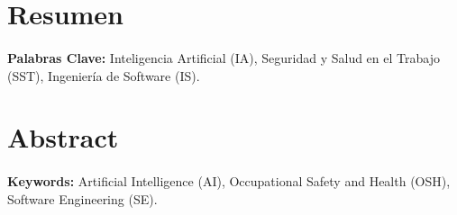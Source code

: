 
\section*{Resumen}

\paragraph*{}{\textbf{Palabras Clave:}}
Inteligencia Artificial (IA), Seguridad y Salud en el Trabajo (SST), Ingenier\'ia de Software (IS).

\section*{Abstract}

\paragraph*{}{\textbf{Keywords:}}
Artificial Intelligence (AI), Occupational Safety and Health (OSH), Software Engineering (SE).
